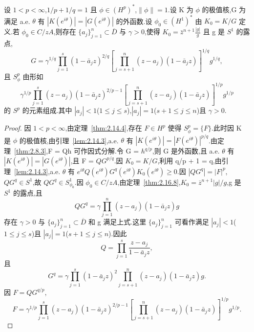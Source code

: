 \begin{theorem}\label{thm:2.16.9}
设 $1 < p < \infty$,$1/p + 1/q = 1$ 且 $\phi \in (H^{p})^{*}$,$\|\phi\| = 1$.设 K 为 $\phi$ 的极值核,G 为满足 a.e. $\theta$ 有 $|K(e^{i\theta})| = |G(e^{i\theta})|$ 的外函数.设 $\phi_{0} \in (H^{1})^{*}$ 由 $K_{0} = K/G$ 定义.若 $\phi_{0} \in C/zA$,则存在 $\{a_{j}\}_{j=1}^{n} \subset \overline{D}$ 与 $\gamma > 0$,使得
$K_{0} = \bar{z}^{n+1}\frac{|g|}{g}$ 且 g 是 $S^{1}$ 的露点,
\begin{equation*}
G = \gamma^{1/q}\prod_{j=1}^{s} (1 - \bar{a}_{j}z)^{2/q}\left[ \prod_{j=s+1}^{n} (z - a_{j})(1 - \bar{a}_{j}z) \right]^{1/q} g^{1/q},
\end{equation*}
且 $S_{\phi}^{p}$ 由形如
\begin{equation*}
\gamma^{1/p}\prod_{j=1}^{s} (z - a_{j})(1 - \bar{a}_{j}z)^{2/p - 1}\left[ \prod_{j=s+1}^{n} (z - a_{j})(1 - \bar{a}_{j}z) \right]^{1/p} g^{1/p}
\end{equation*}
的 $S^{p}$ 的元素组成.其中 $|a_{j}| < 1$($1 \leq j \leq s$),$|a_{j}| = 1$($s + 1 \leq j \leq n$)且 $\gamma > 0$.
\end{theorem}

\begin{proof}
因 $1 < p < \infty$,由定理~\ref{thm:2.14.4},存在 $F \in H^{p}$ 使得 $S_{\phi}^{p} = \{F\}$.此时因 K 是 $\phi$ 的极值核,由引理~\ref{lem:2.14.3},a.e. $\theta$ 有 $|K(e^{i\theta})| = |F(e^{i\theta})|^{p/q}$.由定理~\ref{thm:2.8.3},F = Qh 可作因式分解.令 G = $h^{q/p}$,则 G 是外函数,且 a.e. $\theta$ 有 $|K(e^{i\theta})| = |G(e^{i\theta})|$,且 F = $QG^{p/q}$.因 $K_{0} = K/G$,利用 q/p + 1 = q,由引理~\ref{lem:2.14.3},a.e. $\theta$ 有 $e^{i\theta}Q(e^{i\theta})G^{q}(e^{i\theta})K_{0}(e^{i\theta}) \geq 0$.因 $|QG^{q}| = |F|^{p}$,$QG^{q} \in S^{1}$,故 $QG^{q} \in S_{\phi_{0}}^{1}$.因 $\phi_{0} \in C/zA$,由定理~\ref{thm:2.16.8},$K_{0} = \overline{z}^{n+1}|g|/g$,g 是 $S^{1}$ 的露点,且
\begin{equation*}
QG^{q} = \gamma \prod_{j=1}^{n} (z - a_{j})(1 - \bar{a}_{j}z) g
\end{equation*}
存在 $\gamma > 0$ 与 $\{a_{j}\}_{j=1}^{n} \subset \overline{D}$ 和 g 满足上式.这里 $\{a_{j}\}_{j=1}^{n}$ 可看作满足 $|a_{j}| < 1$($1 \leq j \leq s$)且 $|a_{j}| = 1$($s + 1 \leq j \leq n$).因此
\begin{equation*}
Q = \prod_{j=1}^{s} \frac{z - a_{j}}{1 - \bar{a}_{j}z},
\end{equation*}
且
\begin{equation*}
G^{q} = \gamma \prod_{j=1}^{s} (1 - \bar{a}_{j}z)^{2}\prod_{j=s+1}^{n} (z - a_{j})(1 - \bar{a}_{j}z) g.
\end{equation*}
因 $F = QG^{q/p}$,
\begin{equation*}
F = \gamma^{1/p}\prod_{j=1}^{s} (z - a_{j})(1 - \bar{a}_{j}z)^{2/p - 1}\left[ \prod_{j=s+1}^{n} (z - a_{j})(1 - \bar{a}_{j}z) \right]^{1/p} g^{1/p}.
\end{equation*}
\end{proof}

